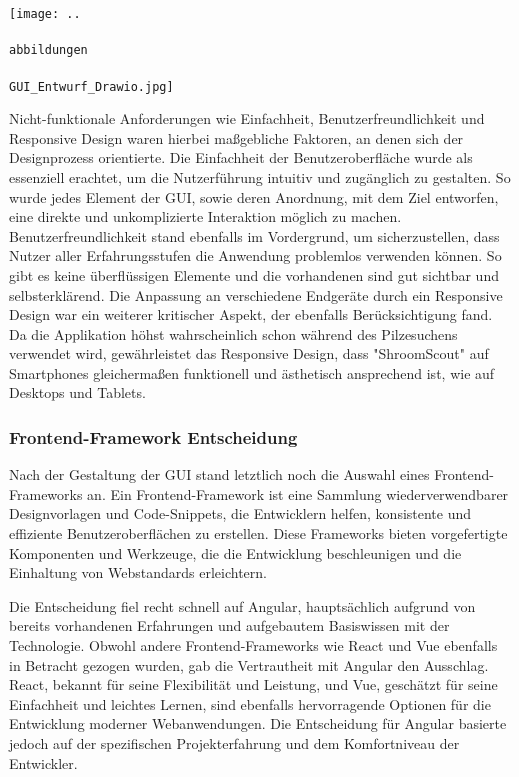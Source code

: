 \documentclass[../main.tex]{subfiles}
\begin{document}
\texttt{[image: ..\\\\abbildungen\\\\GUI\_Entwurf\_Drawio.jpg]}

Nicht-funktionale Anforderungen wie Einfachheit, Benutzerfreundlichkeit und Responsive Design waren hierbei maßgebliche 
Faktoren, an denen sich der Designprozess orientierte. Die Einfachheit der Benutzeroberfläche wurde als essenziell erachtet, 
um die Nutzerführung intuitiv und zugänglich zu gestalten. So wurde jedes Element der GUI, sowie deren Anordnung, mit dem Ziel 
entworfen, eine direkte und unkomplizierte Interaktion möglich zu machen. Benutzerfreundlichkeit stand ebenfalls im Vordergrund, 
um sicherzustellen, dass Nutzer aller Erfahrungsstufen die Anwendung problemlos verwenden können. So gibt es keine überflüssigen
Elemente und die vorhandenen sind gut sichtbar und selbsterklärend. Die Anpassung an verschiedene Endgeräte durch ein Responsive 
Design war ein weiterer kritischer Aspekt, der ebenfalls Berücksichtigung fand. Da die Applikation höhst wahrscheinlich schon 
während des Pilzesuchens verwendet wird, gewährleistet das Responsive Design, dass "ShroomScout" auf Smartphones gleichermaßen 
funktionell und ästhetisch ansprechend ist, wie auf Desktops und Tablets.

\subsubsection{Frontend-Framework Entscheidung}
Nach der Gestaltung der GUI stand letztlich noch die Auswahl eines Frontend-Frameworks an. Ein Frontend-Framework ist eine Sammlung 
wiederverwendbarer Designvorlagen und Code-Snippets, die Entwicklern helfen, konsistente und effiziente Benutzeroberflächen 
zu erstellen. Diese Frameworks bieten vorgefertigte Komponenten und Werkzeuge, die die Entwicklung beschleunigen und die 
Einhaltung von Webstandards erleichtern.

Die Entscheidung fiel recht schnell auf Angular, hauptsächlich aufgrund von bereits vorhandenen Erfahrungen und aufgebautem
Basiswissen mit der Technologie. Obwohl andere Frontend-Frameworks wie React und Vue ebenfalls in Betracht gezogen wurden, 
gab die Vertrautheit mit Angular den Ausschlag. React, bekannt für seine Flexibilität und Leistung, und Vue, geschätzt für 
seine Einfachheit und leichtes Lernen, sind ebenfalls hervorragende Optionen für die Entwicklung moderner Webanwendungen. Die 
Entscheidung für Angular basierte jedoch auf der spezifischen Projekterfahrung und dem Komfortniveau der Entwickler. 
\end{document}
